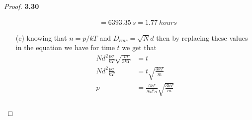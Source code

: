 \documentclass[11pt]{article}
\theoremstyle{definition}
\begin{document}
\begin{proof}{\textbf{3.30}}
\begin{itemize}
\begin{align*}
            &= 6393.35~s = 1.77~hours
        \end{align*}
        \item [(c)] knowing that $n = p/kT$ and $D_{rms} = \sqrt{N} d$ then
        by replacing these values in the equation we have for time $t$
        we get that
        \begin{align*}
            Nd^2\frac{p\sigma}{kT}\sqrt{\frac{m}{3kT}} &= t\\
            Nd^2\frac{p\sigma}{kT} &= t\sqrt{\frac{3kT}{m}}\\
            p &= \frac{tkT}{Nd^2\sigma}\sqrt{\frac{3kT}{m}}\\
        \end{align*}

    \end{itemize}
\end{proof}
\cleardoublepage
\end{document}
